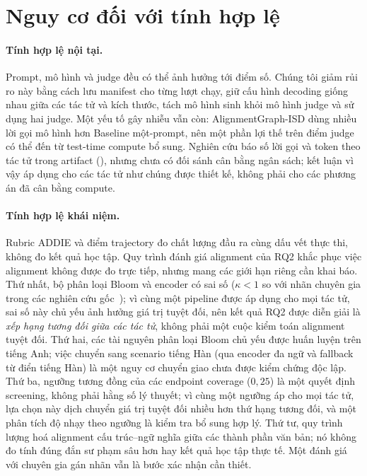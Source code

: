 \section{Nguy cơ đối với tính hợp lệ}
\label{sec:threats-limitations}

\paragraph{Tính hợp lệ nội tại.}
Prompt, mô hình và judge đều có thể ảnh hưởng tới điểm số. Chúng tôi giảm rủi ro này
bằng cách lưu manifest cho từng lượt chạy, giữ cấu hình decoding giống nhau giữa các
tác tử và kích thước, tách mô hình sinh khỏi mô hình judge và sử dụng hai judge. Một
yếu tố gây nhiễu vẫn còn: AlignmentGraph-ISD dùng nhiều lời gọi mô hình hơn Baseline
một-prompt, nên một phần lợi thế trên điểm judge có thể đến từ test-time compute bổ
sung. Nghiên cứu báo số lời gọi và token theo tác tử trong artifact
(), nhưng chưa có đối sánh cân bằng ngân sách; kết luận
vì vậy áp dụng cho các tác tử như chúng được thiết kế, không phải cho các phương án đã
cân bằng compute.

\paragraph{Tính hợp lệ khái niệm.}
Rubric ADDIE và điểm trajectory đo chất lượng đầu ra cùng dấu vết thực thi, không đo
kết quả học tập. Quy trình đánh giá alignment của RQ2 khắc phục việc alignment không
được đo trực tiếp, nhưng mang các giới hạn riêng cần khai báo. Thứ nhất, bộ phân loại
Bloom và encoder có sai số ($\kappa<1$ so với nhãn chuyên gia trong các nghiên cứu
gốc~\cite{waheed2021bloomnet,li2022bloomclassification}); vì cùng một pipeline được áp
dụng cho mọi tác tử, sai số này chủ yếu ảnh hưởng giá trị tuyệt đối, nên kết quả RQ2
được diễn giải là \emph{xếp hạng tương đối giữa các tác tử}, không phải một cuộc kiểm
toán alignment tuyệt đối. Thứ hai, các tài nguyên phân loại Bloom chủ yếu được huấn
luyện trên tiếng Anh; việc chuyển sang scenario tiếng Hàn (qua encoder đa ngữ và
fallback từ điển tiếng Hàn) là một nguy cơ chuyển giao chưa được kiểm chứng độc lập.
Thứ ba, ngưỡng tương đồng của các endpoint coverage ($0{,}25$) là một quyết định
screening, không phải hằng số lý thuyết; vì cùng một ngưỡng áp cho mọi tác tử, lựa
chọn này dịch chuyển giá trị tuyệt đối nhiều hơn thứ hạng tương đối, và một phân tích
độ nhạy theo ngưỡng là kiểm tra bổ sung hợp lý. Thứ tư, quy trình lượng hoá alignment
cấu trúc--ngữ nghĩa giữa các thành phần văn bản; nó không đo tính đúng đắn sư phạm
sâu hơn hay kết quả học tập thực tế. Một đánh giá với chuyên gia gán nhãn vẫn là bước
xác nhận cần thiết.

